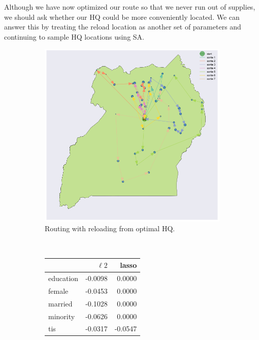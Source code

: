 \documentclass[a0,final]{a0poster}
\begin{document}
\begin{multicols}{3}
Although we have now optimized our route so that we never run out of supplies, we should ask whether our HQ could be more conveniently located. We can answer this by treating the reload location as another set of parameters and continuing to sample HQ locations using SA.

\begin{figure}[H]
  \centering
  \begin{subfigure}[b]{0.5\columnwidth}
    \centering
    \includegraphics[width=\textwidth]{../write-up/figures/routing-reloading-hq-optimal}
    \caption{Routing with reloading from optimal HQ.}
    \label{fig:routing-reloading-hq-optimal}
  \end{subfigure}~\begin{subfigure}[b]{0.5\columnwidth}
    \centering
		\begin{tabular}{lrr}
		\toprule
		{} &        $\ell2$ &     lasso \\
		\midrule
		education & -0.0098 &  0.0000 \\
		female    & -0.0453 &  0.0000 \\
		married   & -0.1028 &  0.0000 \\
		minority  & -0.0626 &  0.0000 \\
		tis       & -0.0317 & -0.0547 \\
		\bottomrule
		\end{tabular}


\end{subfigure}
\end{figure}
\end{multicols}
\end{document}
